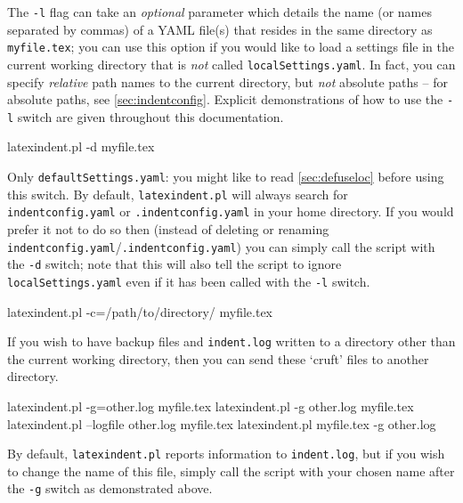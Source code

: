 	The \texttt{-l} flag can take an \emph{optional} parameter which details the name (or names separated by commas) of a YAML file(s)
	that resides in the same directory as \texttt{myfile.tex}; you can use this option if you would
	like to load a settings file in the current working directory that is \emph{not} called \texttt{localSettings.yaml}.
	In fact, you can specify \emph{relative} path names to the current directory, but \emph{not}
	absolute paths -- for absolute paths, see \vref{sec:indentconfig}.
	Explicit demonstrations of how to use the \texttt{-l} switch are given throughout this documentation.

	\begin{commandshell}
latexindent.pl -d myfile.tex
      \end{commandshell}

	Only \texttt{defaultSettings.yaml}: you might like to read \cref{sec:defuseloc} before
	using this switch. By default, \texttt{latexindent.pl} will always search for
	\texttt{indentconfig.yaml} or \texttt{.indentconfig.yaml}  in your home directory. If you would prefer it not to do so
	then (instead of deleting or renaming \texttt{indentconfig.yaml}/\texttt{.indentconfig.yaml}) you can simply
	call the script with the \texttt{-d} switch; note that this will also tell
	the script to ignore \texttt{localSettings.yaml} even if it has been called with the
	\texttt{-l} switch.

	\begin{commandshell}
latexindent.pl -c=/path/to/directory/ myfile.tex
      \end{commandshell}

	If you wish to have backup files and \texttt{indent.log} written to a directory
	other than the current working directory, then you can send these `cruft' files
	to another directory.

	\begin{commandshell}
latexindent.pl -g=other.log myfile.tex
latexindent.pl -g other.log myfile.tex
latexindent.pl --logfile other.log myfile.tex
latexindent.pl myfile.tex -g other.log 
      \end{commandshell}

	By default, \texttt{latexindent.pl} reports information to \texttt{indent.log}, but if you wish to change the
	name of this file, simply call the script with your chosen name after the \texttt{-g} switch as demonstrated above.

